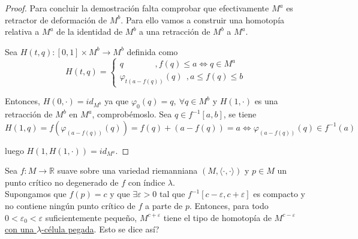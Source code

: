 \begin{proof}
     Para concluir la demostración falta comprobar que efectivamente $M^a$ es retractor de deformación de $M^b$. Para ello vamos a construir una homotopía relativa a $M^a$ de la identidad de $M^b$ a una retracción de $M^b$ a $M^a$.
     
    Sea $H(t,q):[0,1]\times M^b\to M^b$ definida como
    \begin{equation*}
        H(t,q)=
        \begin{cases}
            q~~~~~~~~~~~~~~~~~,f(q)\le a\iff q\in M^a\\
            \varphi_{t(a-f(q))}(q)~~,a\le f(q)\le b
        \end{cases}
    \end{equation*}

    Entonces, $H(0,\cdot) = id_{M^b}$ ya que $\varphi_0(q)=q,~\forall q\in M^b$ y $H(1,\cdot)$ es una retracción de $M^b$ en $M^a$, comprobémoslo. Sea $q\in f^{-1}[a,b]$, se tiene
    \begin{equation*}
        H(1,q)=f(\varphi_{(a-f(q))}(q))= f(q)+(a-f(q))= a \iff \varphi_{(a-f(q))}(q)\in f^{-1}(a)
    \end{equation*}

    luego $H(1,H(1,\cdot))= id_{M^a}$.    

\end{proof}
\bigskip

\begin{theorem}
     Sea $f:M\to\mathbb{R}$ suave sobre una variedad riemanniana $(M,\langle\cdot,\cdot\rangle)$ y $p\in M$ un punto crítico no degenerado de $f$ con índice $\lambda$.\\
     Supongamos que $f(p)=c$ y que  $\exists\varepsilon>0$ tal que $f^{-1}[c-\varepsilon,c+\varepsilon]$ es compacto y no contiene ningún punto crítico de $f$ a parte de $p$. Entonces, para todo $0<\varepsilon_0<\varepsilon$ suficientemente pequeño, $M^{c+\varepsilon}$ tiene el tipo de homotopía de $M^{c-\varepsilon}$ \underline{con una $\lambda$-célula pegada}. {\color{blue}Esto se dice así?}
\end{theorem}

